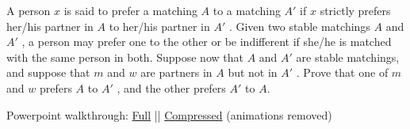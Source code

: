 \question A person $x$ is said to prefer a matching $A$ to a 
matching $A$\ensuremath{'} if $x$ strictly prefers her/his partner 
in $A$ to her/his partner in $A$\ensuremath{'} . Given two stable 
matchings $A$ and $A$\ensuremath{'} , a person may prefer one to 
the other or be indifferent if she/he is matched with the same person 
in both. Suppose now that $A$ and $A$\ensuremath{'} are stable 
matchings, and suppose that $m$ and $w$ are partners in $A$ but not 
in $A$\ensuremath{'} . Prove that one of $m$ and $w$ prefers $A$ to 
$A$\ensuremath{'} , and the other prefers $A$\ensuremath{'} to $A$.

\begin{solution}
Powerpoint walkthrough: 
\href{https://drive.google.com/a/berkeley.edu/file/d/0ByFhRPJ7g\_tLYnJnX0wwSVN0Tms/view?usp=sharing}{Full} ||
\href{https://drive.google.com/a/berkeley.edu/file/d/0ByFhRPJ7g\_tLNktmSFI3UVdFUE0/view?usp=sharing}{Compressed} (animations removed)
\end{solution}

\clearpage